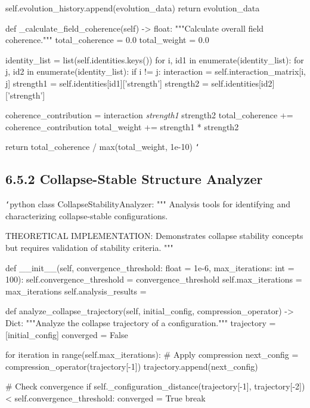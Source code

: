         self.evolution_history.append(evolution_data)
        return evolution_data
        
    def _calculate_field_coherence(self) -> float:
        """Calculate overall field coherence."""
        total_coherence = 0.0
        total_weight = 0.0
        
        identity_list = list(self.identities.keys())
        for i, id1 in enumerate(identity_list):
            for j, id2 in enumerate(identity_list):
                if i != j:
                    interaction = self.interaction_matrix[i, j]
                    strength1 = self.identities[id1]['strength']
                    strength2 = self.identities[id2]['strength']
                    
                    coherence_contribution = interaction \textit{ strength1 } strength2
                    total_coherence += coherence_contribution
                    total_weight += strength1 * strength2
                    
        return total_coherence / max(total_weight, 1e-10)
\texttt{`}

\subsection{6.5.2 Collapse-Stable Structure Analyzer}

\texttt{`}python
class CollapseStabilityAnalyzer:
    """
    Analysis tools for identifying and characterizing collapse-stable configurations.
    
    THEORETICAL IMPLEMENTATION: Demonstrates collapse stability concepts
    but requires validation of stability criteria.
    """
    
    def __init__(self, convergence_threshold: float = 1e-6, max_iterations: int = 100):
        self.convergence_threshold = convergence_threshold
        self.max_iterations = max_iterations
        self.analysis_results = {}
        
    def analyze_collapse_trajectory(self, initial_config, compression_operator) -> Dict:
        """Analyze the collapse trajectory of a configuration."""
        trajectory = [initial_config]
        converged = False
        
        for iteration in range(self.max_iterations):
            \# Apply compression
            next_config = compression_operator(trajectory[-1])
            trajectory.append(next_config)
            
            \# Check convergence
            if self._configuration_distance(trajectory[-1], trajectory[-2]) < self.convergence_threshold:
                converged = True
                break
                

